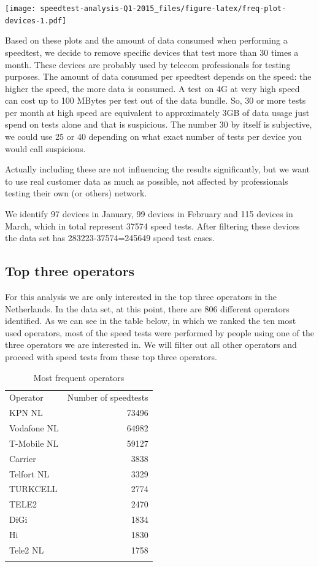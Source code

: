 \documentclass[]{article}
\begin{document}
\texttt{[image: speedtest-analysis-Q1-2015\_files/figure-latex/freq-plot-devices-1.pdf]}

Based on these plots and the amount of data consumed when performing a
speedtest, we decide to remove specific devices that test more than 30
times a month. These devices are probably used by telecom professionals
for testing purposes. The amount of data consumed per speedtest depends
on the speed: the higher the speed, the more data is consumed. A test on
4G at very high speed can cost up to 100 MBytes per test out of the data
bundle. So, 30 or more tests per month at high speed are equivalent to
approximately 3GB of data usage just spend on tests alone and that is
suspicious. The number 30 by itself is subjective, we could use 25 or 40
depending on what exact number of tests per device you would call
suspicious.

Actually including these are not influencing the results significantly,
but we want to use real customer data as much as possible, not affected
by professionals testing their own (or others) network.

We identify 97 devices in January, 99 devices in February and 115
devices in March, which in total represent 37574 speed tests. After
filtering these devices the data set has 283223-37574=245649 speed test
cases.

\subsection{Top three operators}\label{top-three-operators}

For this analysis we are only interested in the top three operators in
the Netherlands. In the data set, at this point, there are 806 different
operators identified. As we can see in the table below, in which we
ranked the ten most used operators, most of the speed tests were
performed by people using one of the three operators we are interested
in. We will filter out all other operators and proceed with speed tests
from these top three operators.

\begin{longtable}[c]{@{}lr@{}}
\toprule\addlinespace
Operator & Number of speedtests
\\\addlinespace
\midrule\endhead
KPN NL & 73496
\\\addlinespace
Vodafone NL & 64982
\\\addlinespace
T-Mobile NL & 59127
\\\addlinespace
Carrier & 3838
\\\addlinespace
Telfort NL & 3329
\\\addlinespace
TURKCELL & 2774
\\\addlinespace
TELE2 & 2470
\\\addlinespace
DiGi & 1834
\\\addlinespace
Hi & 1830
\\\addlinespace
Tele2 NL & 1758
\\\addlinespace
\bottomrule
\addlinespace
\caption{Most frequent operators}
\end{longtable}
\end{document}
